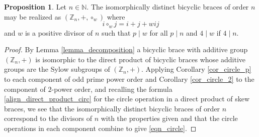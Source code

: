 \documentclass[reqno]{amsart}
\theoremstyle{definition}
\newtheorem{proposition}[theorem]{Proposition}
\newcommand{\Z}{\mathbb{Z}}
\newcommand{\N}{\mathbb{N}}
\begin{document}
\begin{proposition} \label{prop_circle_general}
Let $ n \in \N $. The isomorphically distinct bicyclic braces of order $ n $ may be realized as $ (\Z_{n},+,\circ_{w}) $ where
\begin{equation} \label{eqn_circle}
i \circ_{w} j = i + j + wij
\end{equation}
and $ w $ is a positive divisor of $ n $ such that $ p \mid w $ for all $ p \mid n $ and $ 4 \mid w $ if $ 4 \mid n $. 
\end{proposition}
\begin{proof}
By Lemma \ref{lemma_decomposition} a bicyclic brace with additive group $ (\Z_{n},+) $ is isomorphic to the direct product of bicyclic braces whose additive groups are the Sylow subgroups of $ (\Z_{n},+) $. Applying Corollary \ref{cor_circle_p} to each component of odd prime power order and Corollary \ref{cor_circle_2} to the component of $ 2 $-power order, and recalling the formula \eqref{align_direct_product_circ} for the circle operation in a direct product of skew braces, we see that the isomorphically distinct bicyclic braces of order $ n $ correspond to the divisors of $ n $ with the properties given and that the circle operations in each component combine to give \eqref{eqn_circle}. 
\end{proof}

\end{document}
